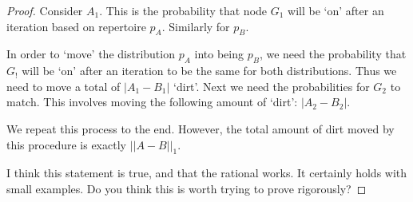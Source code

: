 \documentclass[12pt,a4paper]{article}
\begin{document}
	\begin{proof}
		Consider $A_1$. This is the probability that node $G_1$ will be `on' after an iteration based on repertoire $p_A$. Similarly for $p_B$. 
		
		In order to `move' the distribution $p_A$ into being $p_B$, we need the probability that $G_!$ will be `on' after an iteration to be the same for both distributions. Thus we need to move a total of $|A_1-B_1|$ `dirt'. Next we need the probabilities for $G_2$ to match. This involves moving the following amount of `dirt': $|A_2 - B_2|$.
		
		We repeat this process to the end. However, the total amount of dirt moved by this procedure is exactly $||A-B||_1$. 
		
		I think this statement is true, and that the rational works. It certainly holds with small examples. Do you think this is worth trying to prove rigorously?
		
	\end{proof}
	
\end{document}
